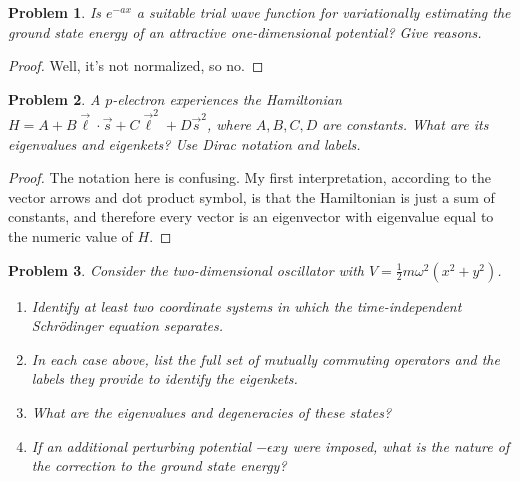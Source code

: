 \documentclass{article}
\newtheorem{plm}{Problem}
\begin{document}
\begin{plm}
  Is $e^{-ax}$ a suitable trial wave function for variationally estimating the ground state energy of an attractive one-dimensional potential?
  Give reasons.
\end{plm}

\begin{proof}
  Well, it's not normalized, so no.
\end{proof}

\begin{plm}
  A $p$-electron experiences the Hamiltonian $H = A + B\vec{\ell}\cdot\vec{s} + C\vec{\ell}^{2} + D\vec{s}^{2}$, where $A, B, C, D$ are constants.
  What are its eigenvalues and eigenkets?
  Use Dirac notation and labels.
\end{plm}

\begin{proof}
  The notation here is confusing.
  My first interpretation, according to the vector arrows and dot product symbol, is that the Hamiltonian is just a sum of constants,
  and therefore every vector is an eigenvector with eigenvalue equal to the numeric value of $H$.
\end{proof}

\begin{plm}
  Consider the two-dimensional oscillator with $V = \frac{1}{2}m\omega^{2}(x^{2} + y^{2})$.
  \begin{enumerate}
  \item Identify at least two coordinate systems in which the time-independent Schr\"odinger equation separates.
  \item In each case above, list the full set of mutually commuting operators and the labels they provide to identify the eigenkets.
  \item What are the eigenvalues and degeneracies of these states?
  \item If an additional perturbing potential $-\epsilon xy$ were imposed, what is the nature of the correction to the ground state energy?
  \end{enumerate}
\end{plm}
\end{document}
